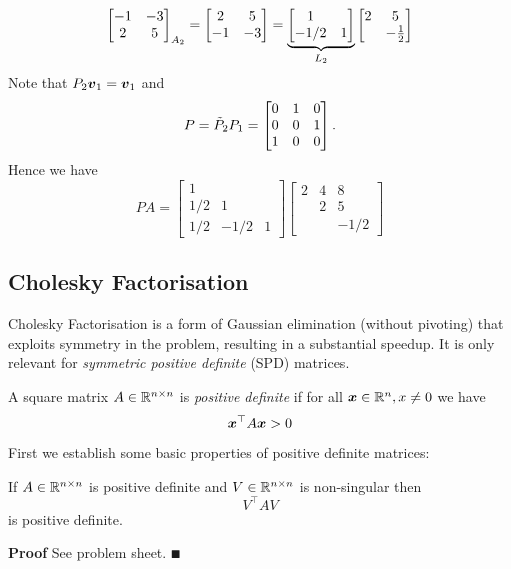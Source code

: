 \begin{example}
\[{\begin{bmatrix}
-1 & -3 \\ 2 & 5 \end{bmatrix}}_{A_2} = \begin{bmatrix} 2 & 5 \\ -1 & -3 \end{bmatrix}
= \underbrace{\begin{bmatrix} 1  \\ -1/2 & 1 \end{bmatrix}}_{L_2} \begin{bmatrix} 2 & 5 \\  & -{1 \over 2} \end{bmatrix}
\]
Note that $P_2 \bm{{\mbox{\boldmath$v$\unboldmath}}}_1 = \bm{{\mbox{\boldmath$v$\unboldmath}}}_1$ and
\[
P = {\tilde P}_2 P_1 = \begin{bmatrix} 0 & 1 & 0 \\ 0 & 0 & 1 \\ 1 &  0 & 0 \end{bmatrix}.
\]
Hence we have
\[
P A = \begin{bmatrix} 1 \\ 
1/2 & 1 \\
1/2 & -1/2 & 1 \end{bmatrix}  \begin{bmatrix} 2 & 4 & 8 \\ & 2 & 5 \\ && -1/2 \end{bmatrix}
\]
\end{example}

\subsection{Cholesky Factorisation}
Cholesky Factorisation is a form of Gaussian elimination (without pivoting) that exploits symmetry in the problem, resulting in a substantial speedup.  It is only relevant for \emph{symmetric positive definite} (SPD) matrices.

\begin{definition} A square matrix $A \in {\mathbb R}^{n \times n}$ is \emph{positive definite} if for all $\bm{{\mbox{\boldmath$x$\unboldmath}}} \in {\mathbb R}^n, x \neq 0$ we have
\[
\bm{{\mbox{\boldmath$x$\unboldmath}}}^\top A \bm{{\mbox{\boldmath$x$\unboldmath}}} > 0
\]
\end{definition}

First we establish some basic properties of positive definite matrices:

\begin{proposition} If  $A \in {\mathbb R}^{n \times n}$ is positive definite and  $V \in {\mathbb R}^{n \times n}$ is non-singular then
\[
V^\ensuremath{\top} A V
\]
is positive definite. \end{proposition}
\textbf{Proof} See problem sheet. \ensuremath{\QED}

